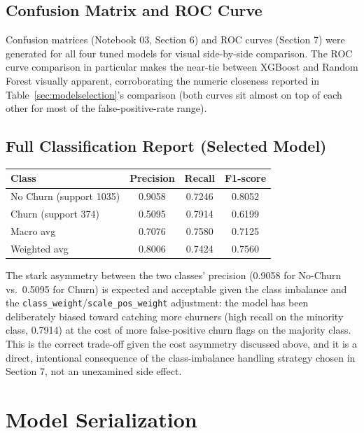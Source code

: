 \documentclass[11pt]{article}
\begin{document}
\subsection{Confusion Matrix and ROC Curve}

Confusion matrices (Notebook 03, Section 6) and ROC curves (Section 7) were generated for all four tuned models for visual side-by-side comparison. The ROC curve comparison in particular makes the near-tie between XGBoost and Random Forest visually apparent, corroborating the numeric closeness reported in Table~\ref{sec:modelselection}'s comparison (both curves sit almost on top of each other for most of the false-positive-rate range).

\subsection{Full Classification Report (Selected Model)}

\begin{center}
\begin{tabular}{lccc}
\toprule
\textbf{Class} & \textbf{Precision} & \textbf{Recall} & \textbf{F1-score} \\
\midrule
No Churn (support 1035) & 0.9058 & 0.7246 & 0.8052 \\
Churn (support 374) & 0.5095 & 0.7914 & 0.6199 \\
\midrule
Macro avg & 0.7076 & 0.7580 & 0.7125 \\
Weighted avg & 0.8006 & 0.7424 & 0.7560 \\
\bottomrule
\end{tabular}
\end{center}

The stark asymmetry between the two classes' precision (0.9058 for No-Churn vs.\ 0.5095 for Churn) is expected and acceptable given the class imbalance and the \texttt{class\_weight}/\texttt{scale\_pos\_weight} adjustment: the model has been deliberately biased toward catching more churners (high recall on the minority class, 0.7914) at the cost of more false-positive churn flags on the majority class. This is the correct trade-off given the cost asymmetry discussed above, and it is a direct, intentional consequence of the class-imbalance handling strategy chosen in Section 7, not an unexamined side effect.

\section{Model Serialization}
\end{document}
